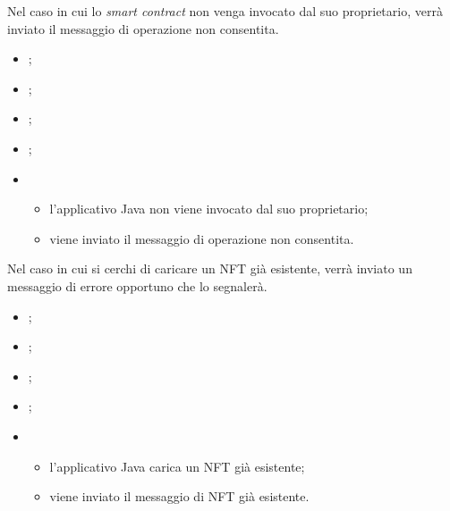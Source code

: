\label{UC:extension.operation-not-allowed}

Nel caso in cui lo \textit{smart contract} non venga invocato dal suo proprietario, verrà inviato il messaggio di operazione non consentita.

\begin{itemize}
  \item {};
  \item {};
  \item {};
  \item {};
  
  \item \UCMain
  \begin{itemize}
    \item l'applicativo Java non viene invocato dal suo proprietario;
    \item viene inviato il messaggio di operazione non consentita. 
  \end{itemize}
\end{itemize}

\label{UC:extension.nft-exists-yet}

Nel caso in cui si cerchi di caricare un NFT già esistente, verrà inviato un messaggio di errore opportuno che lo segnalerà.

\begin{itemize}
  \item {};
  \item {};
  \item {};
  \item {};
  
  \item \UCMain
  \begin{itemize}
    \item l'applicativo Java carica un NFT già esistente;
    \item viene inviato il messaggio di NFT già esistente.
  \end{itemize}
\end{itemize}

\label{UC:extension.nft-not-exists}

